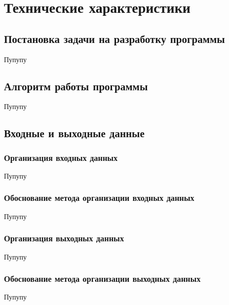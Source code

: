 \section{Технические характеристики}

\subsection{Постановка задачи на разработку программы}

Пупупу

\subsection{Алгоритм работы программы}

Пупупу

\subsection{Входные и выходные данные}

\subsubsection{Организация входных данных}

Пупупу

\subsubsection{Обоснование метода организации входных данных}

Пупупу

\subsubsection{Организация выходных данных}

Пупупу

\subsubsection{Обоснование метода организации выходных данных}

Пупупу